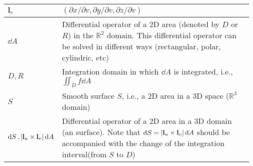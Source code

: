\documentclass{article}
\begin{document}
\begin{xltabular}{\textwidth}{XX}
	\(\mathbf{l}_v\)                                                                                                                                                                                                                           & \((\partial x/ \partial v, \partial y/ \partial v, \partial z/ \partial v)\)                                                                                                                                                                                                                                                        \\ \hline
	\(\dd{A}\)                                                                                                                                                                                                                                 & Differential operator of a 2D area (denoted by \(D\) or \(R\)) in the \(\mathbb{R}^2\) domain. This differential operator can be solved in different ways (rectangular, polar, cylindric, etc) \cite{stewartCalculus2011}                                                                                                           \\ \hline
	\(D, R\)                                                                                                                                                                                                                                   & Integration domain in which \(\dd{A}\) is integrated, i.e., \(\iint_D f \dd{A}\) \cite{stewartCalculus2011}                                                                                                                                                                                                                         \\ \hline
	\(S\)                                                                                                                                                                                                                                      & Smooth surface \(S\), i.e., a 2D area in a 3D space (\(\mathbb{R}^3\) domain)                                                                                                                                                                                                                                                       \\ \hline
	\(\dd{S}, \abs{\mathbf{l}_u\times\mathbf{l}_v} \dd{A} \)                                                                                                                                                                                   & Differential operator of a 2D area in a 3D domain (an surface). Note that \(\dd{S} = \abs{\mathbf{l}_u\times\mathbf{l}_v} \dd{A}\) should be accompanied with the change of the integration interval(from \(S\) to \(D\))                                                                                                           \\ \hline

\end{xltabular}
\end{document}
